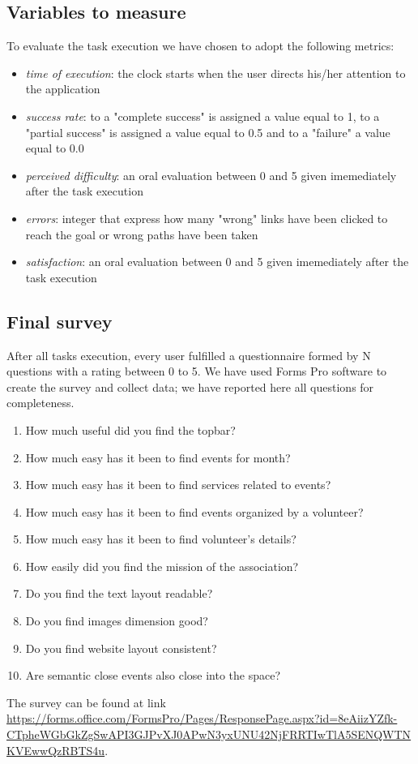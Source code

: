 \subsection{Variables to measure}
To evaluate the task execution we have chosen to adopt the following metrics:
\begin{itemize}
	\item \emph{time of execution}: the clock starts when the user directs his/her attention to the application
	\item \emph{success rate}: to a "complete success" is assigned a value equal to 1, to a "partial success" is assigned a value 		equal to 0.5 and to a "failure" a value equal to 0.0
	\item \emph{perceived difficulty}: an oral evaluation between 0 and 5 given imemediately after the task execution
	\item \emph{errors}: integer that express how many "wrong" links have been clicked to reach the goal or wrong paths have 		been taken
	\item \emph{satisfaction}: an oral evaluation between 0 and 5 given imemediately after the task execution
\end{itemize}

\subsection{Final survey}
After all tasks execution, every user fulfilled a questionnaire formed by N questions with a rating between 0 to 5. We have used Forms Pro software to create the survey and collect data; we have reported here all questions for completeness.
\begin{enumerate}
	\item How much useful did you find the topbar? 
	\item How much easy has it been to find events for month?
	\item How much easy has it been to find services related to events?
	\item How much easy has it been to find events organized by a volunteer?
	\item How much easy has it been to find volunteer's details?
	\item How easily did you find the mission of the association?
	\item Do you find the text layout readable?
	\item Do you find images dimension good?
	\item Do you find website layout consistent?
	\item Are semantic close events also close into the space?
\end{enumerate}
The survey can be found at link \url{https://forms.office.com/FormsPro/Pages/ResponsePage.aspx?id=8eAiizYZfk-CTpheWGbGkZgSwAPI3GJPvXJ0APwN3yxUNU42NjFRRTIwTlA5SENQWTNKVEwwQzRBTS4u}.
